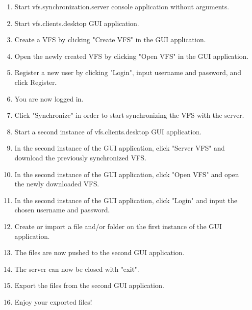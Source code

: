 \documentclass[a4paper,12pt]{article}
\begin{document}
\begin{enumerate}
    \item Start vfs.synchronization.server console application without arguments.
    \item Start vfs.clients.desktop GUI application.
    \item Create a VFS by clicking "Create VFS" in the GUI application.
    \item Open the newly created VFS by clicking "Open VFS" in the GUI application.
    \item Register a new user by clicking "Login", input username and password, and click Register.
    \item You are now logged in.
    \item Click "Synchronize" in order to start synchronizing the VFS with the server.
    \item Start a second instance of vfs.clients.desktop GUI application.
    \item In the second instance of the GUI application, click "Server VFS" and download the previously synchronized VFS.
    \item In the second instance of the GUI application, click "Open VFS" and open the newly downloaded VFS.
    \item In the second instance of the GUI application, click "Login" and input the chosen username and password.
    \item Create or import a file and/or folder on the first instance of the GUI application.
    \item The files are now pushed to the second GUI application.
		\item The server can now be closed with "exit".
    \item Export the files from the second GUI application.
    \item Enjoy your exported files!
\end{enumerate}
\end{document}
